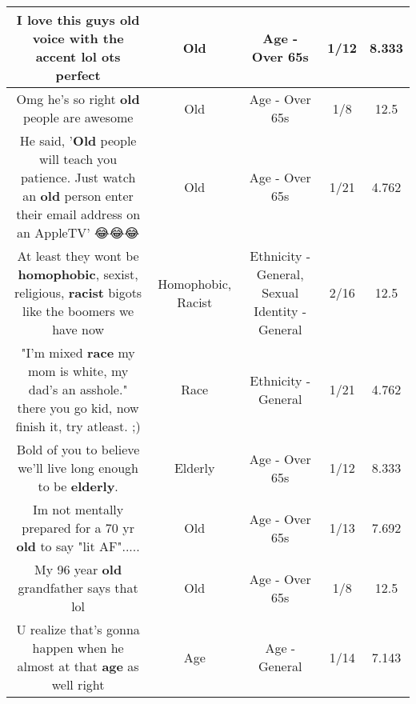 \documentclass[11pt]{article}
\newlength\mylength
\begin{document}
\begin{center}
\begin{longtable}{|C{.65\mylength}|C{.30\mylength}|C{.12\mylength}|C{.12\mylength}|C{.12\mylength}|}
  \small I love this guys \textbf{old} voice with the accent lol ots perfect\normalsize   & Old & Age - Over 65s & 1/12 & 8.333 \\  \hline
  \small Omg he's so right \textbf{old} people are awesome\normalsize   & Old & Age - Over 65s & 1/8 & 12.5 \\  \hline
  \small He said, '\textbf{Old} people will teach you patience. Just watch an \textbf{old} person enter their email address on an AppleTV' 😂😂😂\normalsize   & Old & Age - Over 65s & 1/21 & 4.762 \\  \hline
  \small At least they wont be \textbf{homophobic}, sexist, religious, \textbf{racist} bigots like the boomers we have now\normalsize   & Homophobic, Racist & Ethnicity - General, Sexual Identity - General & 2/16 & 12.5 \\  \hline
  \small "I'm mixed \textbf{race} my mom is white, my dad's an asshole." there you go kid, now finish it, try atleast. ;)\normalsize   & Race & Ethnicity - General & 1/21 & 4.762 \\  \hline
  \small Bold of you to believe we'll live long enough to be \textbf{elderly}.\normalsize   & Elderly & Age - Over 65s & 1/12 & 8.333 \\  \hline
  \small Im not mentally prepared for a 70 yr \textbf{old} to say "lit AF".....\normalsize   & Old & Age - Over 65s & 1/13 & 7.692 \\  \hline
  \small My 96 year \textbf{old} grandfather says that lol\normalsize   & Old & Age - Over 65s & 1/8 & 12.5 \\  \hline
  \small U realize that's gonna happen when he almost at that \textbf{age} as well right\normalsize   & Age & Age - General & 1/14 & 7.143 \\  \hline

\end{longtable}
\end{center}
\end{document}
